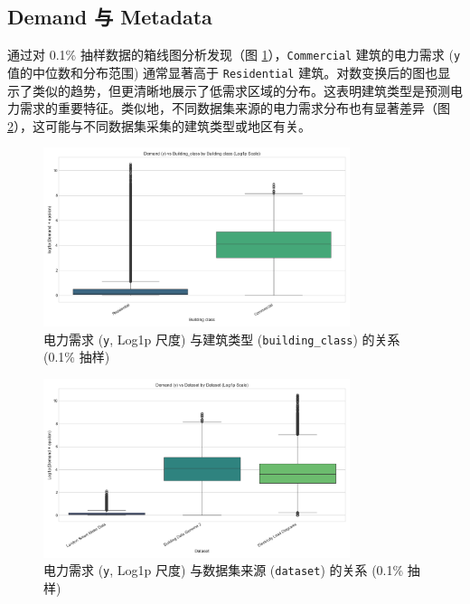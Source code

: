 \documentclass{article} %
\begin{document}
\subsection{Demand 与 Metadata}
\label{subsec:demand_metadata}
通过对 0.1\% 抽样数据的箱线图分析发现（图 \ref{fig:demand_vs_building_class}），\texttt{Commercial} 建筑的电力需求 (\texttt{y} 值的中位数和分布范围) 通常显著高于 \texttt{Residential} 建筑。对数变换后的图也显示了类似的趋势，但更清晰地展示了低需求区域的分布。这表明建筑类型是预测电力需求的重要特征。类似地，不同数据集来源的电力需求分布也有显著差异（图 \ref{fig:demand_vs_dataset}），这可能与不同数据集采集的建筑类型或地区有关。

\begin{figure}[H]
    \centering
    \includegraphics[width=0.8\textwidth]{../plots/demand_vs_building_class_boxplot_log1p.png} %
    \caption{电力需求 (\texttt{y}, Log1p 尺度) 与建筑类型 (\texttt{building\_class}) 的关系 (0.1\% 抽样)}
    \label{fig:demand_vs_building_class}
\end{figure}

\begin{figure}[H]
    \centering
    \includegraphics[width=0.8\textwidth]{../plots/demand_vs_dataset_boxplot_log1p.png} %
    \caption{电力需求 (\texttt{y}, Log1p 尺度) 与数据集来源 (\texttt{dataset}) 的关系 (0.1\% 抽样)}
    \label{fig:demand_vs_dataset}
\end{figure}
\end{document}
